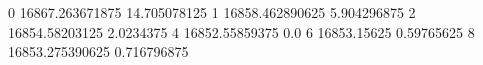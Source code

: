 0 16867.263671875 14.705078125
1 16858.462890625 5.904296875
2 16854.58203125 2.0234375
4 16852.55859375 0.0
6 16853.15625 0.59765625
8 16853.275390625 0.716796875

